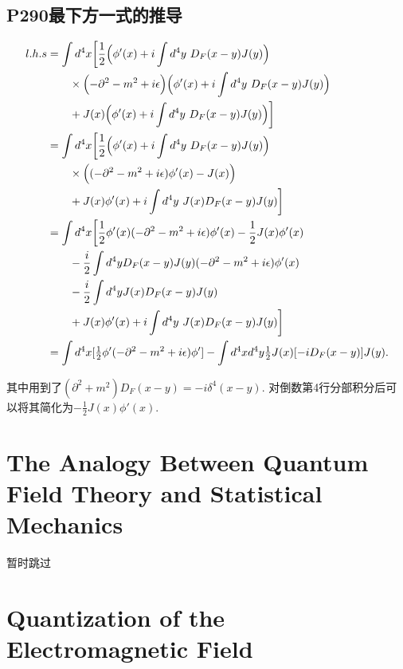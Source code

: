 \documentclass[10pt,b5paper,openany]{book}
\begin{document}
\subsection{P290最下方一式的推导}
\begin{equation}
  \begin{aligned}
    l.h.s &= \int d^4 x \biggl[\frac{1}{2}\Bigl(\phi'(x) + i\int d^4y\ D_F(x-y)J(y)\Bigr) \\ 
    &\qquad \times \Bigl(-\partial^2 - m^2 + i\epsilon\Bigr)\Bigl(\phi'(x) + i\int d^4y\ D_F(x-y)J(y)\Bigr) \\
    &\qquad + J(x)\Bigl(\phi'(x) + i\int d^4y\ D_F(x-y)J(y)\Bigr)\biggr] \\
    &= \int d^4 x \biggl[\frac{1}{2}\Bigl(\phi'(x) + i\int d^4y\ D_F(x-y)J(y)\Bigr) \\ 
    &\qquad \times \Bigl((-\partial^2 - m^2 + i\epsilon)\phi'(x) - J(x)\Bigr) \\
    &\qquad + J(x)\phi'(x) + i\int d^4y\ J(x)D_F(x-y)J(y)\biggr] \\
    &= \int d^4 x \biggl[\frac{1}{2}\phi'(x)(-\partial^2 - m^2 + i\epsilon)\phi'(x) - \frac{1}{2}J(x)\phi'(x) \\
    &\qquad - \frac{i}{2}\int d^4y D_F(x-y)J(y)(-\partial^2 - m^2 + i\epsilon)\phi'(x) \\ 
    &\qquad - \frac{i}{2}\int d^4y J(x)D_F(x-y)J(y) \\
    &\qquad + J(x)\phi'(x) + i\int d^4y\ J(x)D_F(x-y)J(y)\biggr] \\
    &= \int d^4x [\tfrac{1}{2}\phi'(-\partial^2 - m^2 + i\epsilon)\phi'] - \int d^4x d^4y \tfrac{1}{2}J(x)[-iD_F(x-y)]J(y). 
  \end{aligned}
\end{equation}

其中用到了$(\partial^2 + m^2)D_F(x-y) = -i\delta^4(x-y)$. 对倒数第4行分部积分后可以将其简化为$-\frac{1}{2}J(x)\phi'(x)$. 

\section{The Analogy Between Quantum Field Theory and Statistical Mechanics}

暂时跳过

\section{Quantization of the Electromagnetic Field}
\end{document}
